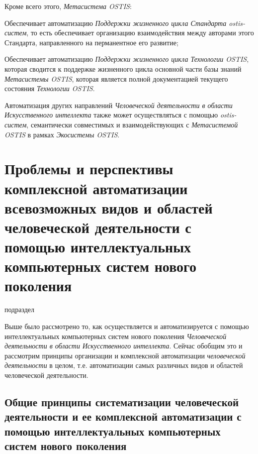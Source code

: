 Кроме всего этого, \textit{Метасистема OSTIS}: 
\begin{textitemize}
	\item Обеспечивает автоматизацию \textit{Поддержки жизненного цикла Стандарта ostis-систем}, то есть обеспечивает организацию взаимодействия между авторами этого Стандарта, направленного на перманентное его развитие;
	\item Обеспечивает автоматизацию \textit{Поддержки жизненного цикла Технологии OSTIS}, которая сводится к поддержке жизненного цикла основной части базы знаний \textit{Метасистемы OSTIS}, которая является полной документацией текущего состояния \textit{Технологии OSTIS}. 
\end{textitemize}

Автоматизация других направлений \textit{Человеческой деятельности в области Искусственного интеллекта} также может осуществляться с помощью \textit{ostis-систем}, семантически совместимых и взаимодействующих с \textit{Метасистемой OSTIS} в рамках \textit{Экосистемы OSTIS}.

\section{Проблемы и перспективы комплексной автоматизации всевозможных видов и областей человеческой деятельности с помощью интеллектуальных компьютерных систем нового поколения}
\label{sec_activity_perspectives}

\begin{scnrelfromlist}{подраздел}
\end{scnrelfromlist}

Выше было рассмотрено то, как осуществляется и автоматизируется с помощью интеллектуальных компьютерных систем нового поколения  \textit{Человеческой деятельности в области Искусственного интеллекта}. Сейчас обобщим это и рассмотрим принципы организации и комплексной автоматизации \textit{человеческой деятельности} в целом, т.е. автоматизации самых различных видов и областей человеческой деятельности.

\subsection{Общие принципы систематизации человеческой деятельности и ее комплексной автоматизации с помощью интеллектуальных компьютерных систем нового поколения}
\label{subsec_general_principles_systematization_human_activity_and_its_complex_automation_help_ICS}

